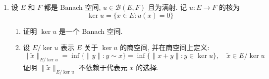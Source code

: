 \begin{enumerate}
    \item 设 $E$ 和 $F$ 都是 Banach 空间, $u \in \mathcal{B}(E, F)$ 且为满射. 记 $u: E \rightarrow F$ 的核为
    \[
    \operatorname{ker} u=\{x \in E: u(x)=0\}
    \]
        \begin{enumerate}
            \item 证明  $\operatorname{ker}u$ 是一个 Banach 空间.
            \item 设 $E / \operatorname{ker} u$ 表示 $E$ 关于 $\operatorname{ker} u$ 的商空间, 并在商空间上定义:
            \[
            \|\widetilde{x}\|_{E / \operatorname{ker} u}=\inf \{\|y\|: y \sim x\}=\inf \{\|x+y\|: y \in \operatorname{ker} u\}, \quad \widetilde{x} \in E / \operatorname{ker} u
            \]
            证明 $\|\widetilde{x}\|_{E / \operatorname{ker} u}$ 不依赖于代表元 $x$ 的选择.


\end{enumerate}
\end{enumerate}
